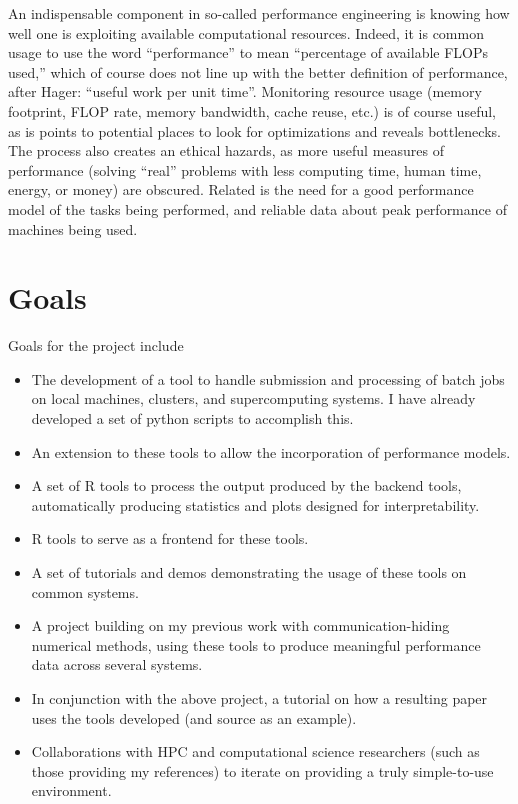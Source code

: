 \documentclass{article}
\begin{document}
An indispensable component in so-called performance engineering is knowing how well one is exploiting available computational resources. Indeed, it is common usage to use the word ``performance'' to mean ``percentage of available FLOPs used,'' which of course does not line up with the better definition of performance, after Hager: ``useful work per unit time''.
Monitoring resource usage (memory footprint, FLOP rate, memory bandwidth, cache reuse, etc.) is of course useful, as is points to potential places to look for optimizations and reveals bottlenecks. The process also creates an ethical hazards, as more useful measures of performance (solving ``real'' problems with less computing time, human time, energy, or money) are obscured.
Related is the need for a good performance model of the tasks being performed, and reliable data about peak performance of machines being used. 

\section*{Goals}
Goals for the project include
\begin{itemize}
  \item The development of a tool to handle submission and processing of batch jobs on local machines, clusters, and supercomputing systems. I have already developed a set of python scripts to accomplish this.
  \item An extension to these tools to allow the incorporation of performance models.
    \item A set of R tools to process the output produced by the backend tools, automatically producing statistics and plots designed for interpretability.
      \item R tools to serve as a frontend for these tools.
      \item A set of tutorials and demos demonstrating the usage of these tools on common systems.
      \item A project building on my previous work with communication-hiding numerical methods, using these tools to produce meaningful performance data across several systems.
      \item In conjunction with the above project, a tutorial on how a resulting paper uses the tools developed (and source as an example).
      \item Collaborations with HPC and computational science researchers (such as those providing my references) to iterate on providing a truly simple-to-use environment. 
\end{itemize}



{}

\end{document}
